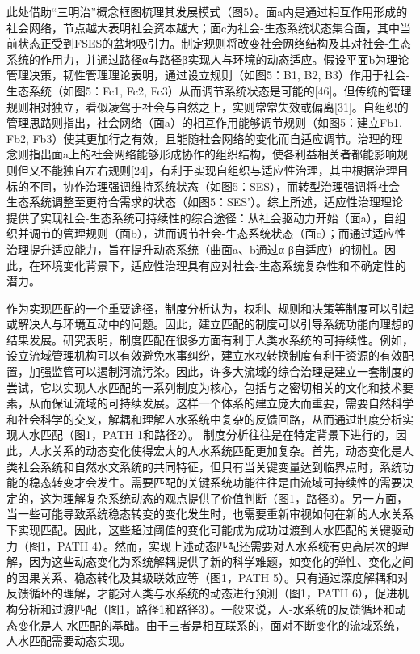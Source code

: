 此处借助“三明治”概念框图梳理其发展模式（图5）。面a内是通过相互作用形成的社会网络，节点越大表明社会资本越大；面c为社会-生态系统状态集合面，其中当前状态正受到FSES的盆地吸引力。制定规则将改变社会网络结构及其对社会-生态系统的作用力，并通过路径α与路径β实现人与环境的动态适应。假设平面b为理论管理决策，韧性管理理论表明，通过设立规则（如图5：B1, B2, B3）作用于社会-生态系统（如图5：Fc1, Fc2, Fc3）从而调节系统状态是可能的[46]。但传统的管理规则相对独立，看似凌驾于社会与自然之上，实则常常失效或偏离[31]。自组织的管理思路则指出，社会网络（面a）的相互作用能够调节规则（如图5：建立Fb1, Fb2, Fb3）使其更加行之有效，且能随社会网络的变化而自适应调节。治理的理念则指出面a上的社会网络能够形成协作的组织结构，使各利益相关者都能影响规则但又不能独自左右规则[24]，有利于实现自组织与适应性治理，其中根据治理目标的不同，协作治理强调维持系统状态（如图5：SES），而转型治理强调将社会-生态系统调整至更符合需求的状态（如图5：SES’）。综上所述，适应性治理理论提供了实现社会-生态系统可持续性的综合途径：从社会驱动力开始（面a），自组织并调节的管理规则（面b），进而调节社会-生态系统状态（面c）；而通过适应性治理提升适应能力，旨在提升动态系统（曲面a、b通过α-β自适应）的韧性。因此，在环境变化背景下，适应性治理具有应对社会-生态系统复杂性和不确定性的潜力。

作为实现匹配的一个重要途径，制度分析认为，权利、规则和决策等制度可以引起或解决人与环境互动中的问题。因此，建立匹配的制度可以引导系统功能向理想的结果发展。研究表明，制度匹配在很多方面有利于人类水系统的可持续性。例如，设立流域管理机构可以有效避免水事纠纷，建立水权转换制度有利于资源的有效配置，加强监管可以遏制河流污染。因此，许多大流域的综合治理是建立一套制度的尝试，它以实现人水匹配的一系列制度为核心，包括与之密切相关的文化和技术要素，从而保证流域的可持续发展。这样一个体系的建立庞大而重要，需要自然科学和社会科学的交叉，解耦和理解人水系统中复杂的反馈回路，从而通过制度分析实现人水匹配（图1，PATH 1和路径2）。
制度分析往往是在特定背景下进行的，因此，人水关系的动态变化使得宏大的人水系统匹配更加复杂。首先，动态变化是人类社会系统和自然水文系统的共同特征，但只有当关键变量达到临界点时，系统功能的稳态转变才会发生。需要匹配的关键系统功能往往是由流域可持续性的需要决定的，这为理解复杂系统动态的观点提供了价值判断（图1，路径3）。另一方面，当一些可能导致系统稳态转变的变化发生时，也需要重新审视如何在新的人水关系下实现匹配。因此，这些超过阈值的变化可能成为成功过渡到人水匹配的关键驱动力（图1，PATH 4）。然而，实现上述动态匹配还需要对人水系统有更高层次的理解，因为这些动态变化为系统解耦提供了新的科学难题，如变化的弹性、变化之间的因果关系、稳态转化及其级联效应等（图1，PATH 5）。只有通过深度解耦和对反馈循环的理解，才能对人类与水系统的动态进行预测（图1，PATH 6），促进机构分析和过渡匹配（图1，路径1和路径3）。一般来说，人-水系统的反馈循环和动态变化是人-水匹配的基础。由于三者是相互联系的，面对不断变化的流域系统，人水匹配需要动态实现。
